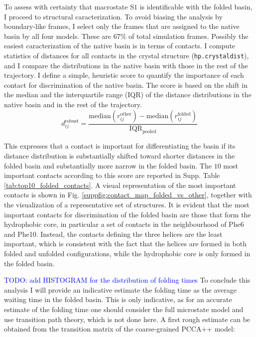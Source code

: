 \documentclass[prl,twocolumn]{revtex4-1}
\begin{document}
To assess with certainty that macrostate S$1$ is identificable with the folded basin, I proceed to structural caracterization. To avoid biasing the analysis by boundary-like frames, I select only the frames that are assigned to the native basin by all four models. These are $67\%$ of total simulation frames.
Possibly the easiest caracterization of the native basin is in terms of contacts. I compute statistics  of distances for all contacts in the crystal structure (\texttt{hp.crystaldist}), and I compare the distributions in the native basin with those in the rest of the trajectory.
I define a simple, heuristic score to quantify the importance of each contact for discrimination of the native basin. The score is based on the shift in the median and the interquartile range (IQR) of the distance distributions in the native basin and in the rest of the trajectory.
\begin{equation*}
d^{\mathrm{robust}}_{ij}
=
\frac{
\mathrm{median}(r_{ij}^{\mathrm{other}})
-
\mathrm{median}(r_{ij}^{\mathrm{folded}})
}{
\mathrm{IQR}_{\mathrm{pooled}}
}
\end{equation*}

This expresses that a contact is important for differentiating the basin if its distance distribution is substantially shifted toward shorter distances in the folded basin and substantially more narrow in the folded basin.
The $10$ most important contacts according to this score are reported in Supp. Table \ref{tab:top10_folded_contacts}. A visual representation of the most important contacts is shown in Fig. \ref{suppfig:contact_map_folded_vs_other}, together with the visualization of a representative set of structures.
It is evident that the most important contacts for discrimination of the folded basin are those that form the hydrophobic core, in particular a set of contacts in the neighbourhood of Phe6 and Phe10. Instead,
the contacts defining the three helices are the least important, which is consistent with the fact that the helices are formed in both folded and unfolded configurations, while the hydrophobic core is only formed in the folded basin. 


\textcolor{blue}{TODO: add HISTOGRAM for the distribution of folding times}
To conclude this analysis I will provide an indicative estimate the folding time as the average waiting time in the folded basin. This is only indicative, as for an accurate estimate of the folding time one should consider the full microstate model and use transition path theory, which is not done here.
A first rough estimate can be obtained from the transition matrix of the coarse-grained PCCA++ model:
\end{document}
